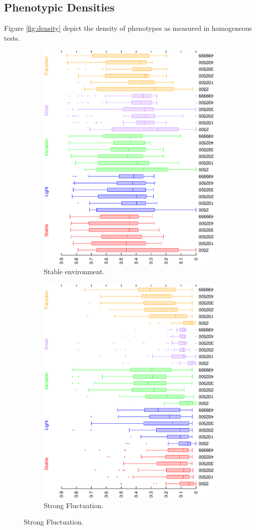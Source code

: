 \subsection{Phenotypic Densities}
Figure \ref{fig:density} depict the density of phenotypes as measured in homogeneous tests. 

\begin{figure}[H]
\begin{subfigure}{.25\textwidth}
  \centering
  \includegraphics[width=.7\linewidth, angle =-90]{img/boxdensitystable.eps}
  \caption{Stable environment.}
  \label{fig:sfig1}
\end{subfigure}%
\begin{subfigure}{.25\textwidth}
  \centering
  \includegraphics[width=.7\linewidth, angle =-90]{img/boxdensityvariation.eps}
  \caption{Strong Fluctuation.}
  \label{fig:sfig2}
\end{subfigure}


\end{figure}
